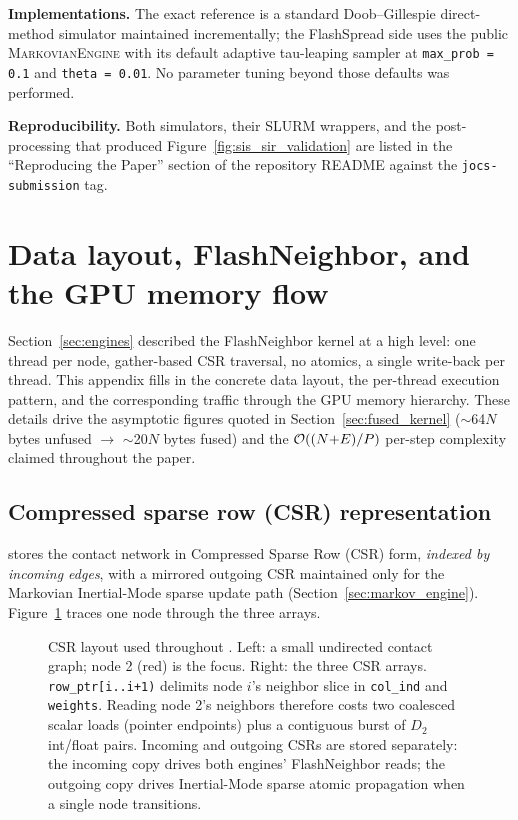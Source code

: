 \textbf{Implementations.} The exact reference is a standard Doob--Gillespie direct-method simulator maintained incrementally; the FlashSpread side uses the public \textsc{MarkovianEngine} with its default adaptive tau-leaping sampler at \texttt{max\_prob = 0.1} and \texttt{theta = 0.01}. No parameter tuning beyond those defaults was performed.

\textbf{Reproducibility.} Both simulators, their SLURM wrappers, and the post-processing that produced Figure~\ref{fig:sis_sir_validation} are listed in the ``Reproducing the Paper'' section of the repository README against the \texttt{jocs-submission} tag.

\section{Data layout, FlashNeighbor, and the GPU memory flow}
\label{app:data_flow}

Section~\ref{sec:engines} described the FlashNeighbor kernel at a high level: one thread per node, gather-based CSR traversal, no atomics, a single write-back per thread. This appendix fills in the concrete data layout, the per-thread execution pattern, and the corresponding traffic through the GPU memory hierarchy. These details drive the asymptotic figures quoted in Section~\ref{sec:fused_kernel} ($\sim$64$N$ bytes unfused $\to$ $\sim$20$N$ bytes fused) and the $\mathcal{O}((N{+}E)/P)$ per-step complexity claimed throughout the paper.

\subsection{Compressed sparse row (CSR) representation}
\label{app:csr}

\flashspread{} stores the contact network in Compressed Sparse Row (CSR) form, \emph{indexed by incoming edges}, with a mirrored outgoing CSR maintained only for the Markovian Inertial-Mode sparse update path (Section~\ref{sec:markov_engine}). Figure~\ref{fig:csr_layout} traces one node through the three arrays.

\begin{figure}[H]
\centering

\caption{CSR layout used throughout \flashspread{}. Left: a small undirected contact graph; node 2 (red) is the focus. Right: the three CSR arrays. \texttt{row\_ptr[i..i+1)} delimits node $i$'s neighbor slice in \texttt{col\_ind} and \texttt{weights}. Reading node 2's neighbors therefore costs two coalesced scalar loads (pointer endpoints) plus a contiguous burst of $D_2$ int/float pairs. Incoming and outgoing CSRs are stored separately: the incoming copy drives both engines' FlashNeighbor reads; the outgoing copy drives Inertial-Mode sparse atomic propagation when a single node transitions.}
\label{fig:csr_layout}
\end{figure}

